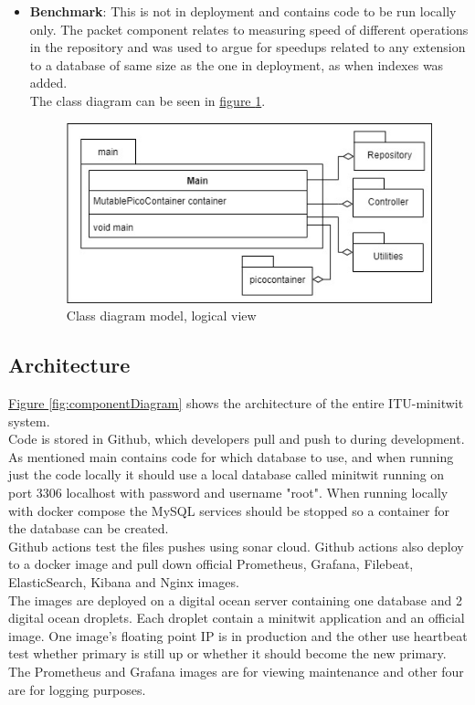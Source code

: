 \begin{itemize}
    \item \textbf{Benchmark}: This is not in deployment and contains code to be run locally only. The packet component relates to measuring speed of different operations in the repository and was used to argue for speedups related to any extension to a database of same size as the one in deployment, as when indexes was added.\\
    The class diagram can be seen in \hyperref[fig:classDiagramModel]{figure \ref{fig:classDiagramModel}}.
    \begin{figure}[H]
        \centering
        \includegraphics[width=1.0\textwidth]{images/class_diagram_model.jpg}
        \caption{Class diagram model, logical view}
        \label{fig:classDiagramModel}
    \end{figure}
\end{itemize}


\subsection{Architecture} %
\hyperref[fig:componentDiagram]{Figure \ref{fig:componentDiagram}} shows the architecture of the entire ITU-minitwit system.\\
Code is stored in Github, which developers pull and push to during development. As mentioned main contains code for which database to use, and when running just the code locally it should use a local database called minitwit running on port 3306 localhost with password and username "root". When running locally with docker compose the MySQL services should be stopped so a container for the database can be created.\\
Github actions test the files pushes using sonar cloud. Github actions also deploy to a docker image and pull down official Prometheus, Grafana, Filebeat, ElasticSearch, Kibana and Nginx images.\\
The images are deployed on a digital ocean server containing one database and 2 digital ocean droplets. Each droplet contain a minitwit application and an official image. One image's floating point IP is in production and the other use heartbeat test whether primary is still up or whether it should become the new primary.
\\
The Prometheus and Grafana images are for viewing maintenance and other four are for logging purposes.




